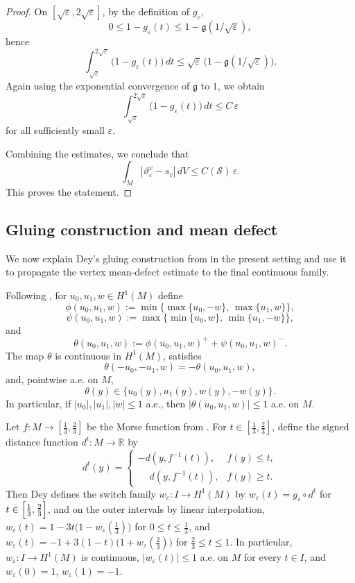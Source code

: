 \documentclass[12pt,english]{article}
\theoremstyle{definition}
\begin{document}
\begin{proof}
On $[\sqrt{\varepsilon},2\sqrt{\varepsilon}]$, by the definition of $g_\varepsilon$,
\[
0\le 1-g_\varepsilon(t)\le 1-\mathfrak g(1/\sqrt{\varepsilon}),
\]
hence
\[
\int_{\sqrt{\varepsilon}}^{2\sqrt{\varepsilon}} \bigl(1-g_\varepsilon(t)\bigr)\,dt
\le
\sqrt{\varepsilon}\,\bigl(1-\mathfrak g(1/\sqrt{\varepsilon})\bigr).
\]
Again using the exponential convergence of $\mathfrak g$ to $1$, we obtain
\[
\int_{\sqrt{\varepsilon}}^{2\sqrt{\varepsilon}} \bigl(1-g_\varepsilon(t)\bigr)\,dt
\le C\,\varepsilon
\]
for all sufficiently small $\varepsilon$.

Combining the estimates, we conclude that
\[
\int_M |\vartheta_\varepsilon^v-s_v|\,dV\le C(\mathscr S)\,\varepsilon.
\]
This proves the statement.
\end{proof}

\subsection{Gluing construction and mean defect}

We now explain Dey's gluing construction from \cite[Section~3.5]{Dey} in the present setting
and use it to propagate the vertex mean-defect estimate to the final continuous family.

Following \cite[Proposition~3.10]{Dey}, for \(u_0,u_1,w\in H^1(M)\) define
\[
\phi(u_0,u_1,w):=\min\{\max\{u_0,-w\},\,\max\{u_1,w\}\},
\]
\[
\psi(u_0,u_1,w):=\max\{\min\{u_0,w\},\,\min\{u_1,-w\}\},
\]
and
\[
\theta(u_0,u_1,w):=\phi(u_0,u_1,w)^+ + \psi(u_0,u_1,w)^-.
\]
The map \(\theta\) is continuous in \(H^1(M)\), satisfies
\begin{equation}\label{eq:theta_sign_symmetry}
\theta(-u_0,-u_1,w)=-\theta(u_0,u_1,w),
\end{equation}
and, pointwise a.e. on \(M\),
\begin{equation}\label{eq:theta_pointwise_selection}
\theta(y)\in\{u_0(y),u_1(y),w(y),-w(y)\}.
\end{equation}
In particular, if \(|u_0|,|u_1|,|w|\le 1\) a.e., then $|\theta(u_0,u_1,w)|\le 1$ a.e. on $M$.

Let \(f:M\to [\frac13,\frac23]\) be the Morse function from \cite[Section~3.5]{Dey}.
For \(t\in [\frac13,\frac23]\), define the signed distance function
$d^t:M\to \mathbb{R}$ by
\[
d^t(y)=
\begin{cases}
-d(y,f^{-1}(t)),& f(y)\le t,\\[3pt]
\phantom{-}d(y,f^{-1}(t)),& f(y)\ge t.
\end{cases}
\]
Then Dey defines the switch family \(w_\varepsilon:I\to H^1(M)\) by $w_\varepsilon(t)=g_\varepsilon\circ d^t$ for $t\in\Bigl[\frac13,\frac23\Bigr]$, and on the outer intervals by linear interpolation, $w_\varepsilon(t)=1-3t\bigl(1-w_\varepsilon(\tfrac13)\bigr)$ for $0\le t\le \frac13$, and $w_\varepsilon(t)=-1+3(1-t)\bigl(1+w_\varepsilon(\tfrac23)\bigr)$ for $\frac23\le t\le 1$. In particular, \(w_\varepsilon:I\to H^1(M)\) is continuous, $|w_\varepsilon(t)|\le 1$ a.e. on $M$ for every $t\in I$, and $w_\varepsilon(0)=1$, $w_\varepsilon(1)=-1$.
\end{document}
